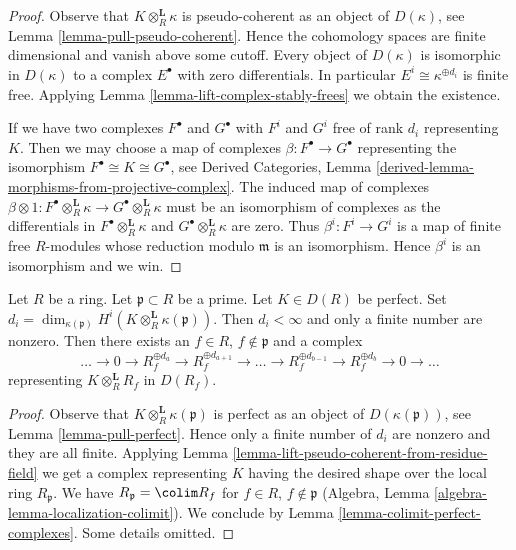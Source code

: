 \begin{proof}
Observe that $K \otimes_R^\mathbf{L} \kappa$ is pseudo-coherent
as an object of $D(\kappa)$, see Lemma \ref{lemma-pull-pseudo-coherent}.
Hence the cohomology spaces are finite dimensional and vanish above
some cutoff. Every object of $D(\kappa)$ is isomorphic
in $D(\kappa)$ to a complex $E^\bullet$ with zero differentials.
In particular $E^i \cong \kappa^{\oplus d_i}$ is finite free.
Applying Lemma \ref{lemma-lift-complex-stably-frees} we obtain
the existence.

\medskip\noindent
If we have two complexes $F^\bullet$ and $G^\bullet$
with $F^i$ and $G^i$ free of rank $d_i$ representing $K$.
Then we may choose a map of complexes $\beta : F^\bullet \to G^\bullet$
representing the isomorphism $F^\bullet \cong K \cong G^\bullet$, see
Derived Categories, Lemma
\ref{derived-lemma-morphisms-from-projective-complex}.
The induced map of complexes
$\beta \otimes 1 : F^\bullet \otimes_R^\mathbf{L} \kappa \to
G^\bullet \otimes_R^\mathbf{L} \kappa$
must be an isomorphism of complexes as the differentials
in $F^\bullet \otimes_R^\mathbf{L} \kappa$ and
$G^\bullet \otimes_R^\mathbf{L} \kappa$ are zero.
Thus $\beta^i : F^i \to G^i$ is a map of finite free $R$-modules
whose reduction modulo $\mathfrak m$ is an isomorphism.
Hence $\beta^i$ is an isomorphism and we win.
\end{proof}

\begin{lemma}
\label{lemma-lift-perfect-from-residue-field}
Let $R$ be a ring. Let $\mathfrak p \subset R$ be a prime. Let $K \in D(R)$
be perfect. Set
$d_i =
\dim_{\kappa(\mathfrak p)} H^i(K \otimes_R^\mathbf{L} \kappa(\mathfrak p))$.
Then $d_i < \infty$ and only a finite number are nonzero.
Then there exists an $f \in R$, $f \not \in \mathfrak p$ and a
complex
$$
\ldots \to 0 \to R_f^{\oplus d_a} \to R_f^{\oplus d_{a + 1}} \to
\ldots \to
R_f^{\oplus d_{b - 1}} \to
R_f^{\oplus d_b} \to 0
\to \ldots
$$
representing $K \otimes_R^\mathbf{L} R_f$ in $D(R_f)$.
\end{lemma}

\begin{proof}
Observe that $K \otimes_R^\mathbf{L} \kappa(\mathfrak p)$
is perfect as an object of $D(\kappa(\mathfrak p))$, see
Lemma \ref{lemma-pull-perfect}. Hence only a finite number of
$d_i$ are nonzero and they are all finite. Applying
Lemma \ref{lemma-lift-pseudo-coherent-from-residue-field}
we get a complex representing $K$
having the desired shape over the local ring $R_\mathfrak p$.
We have $R_\mathfrak p = \colim R_f$ for
$f \in R$, $f \not \in \mathfrak p$
(Algebra, Lemma \ref{algebra-lemma-localization-colimit}).
We conclude by Lemma \ref{lemma-colimit-perfect-complexes}.
Some details omitted.
\end{proof}

